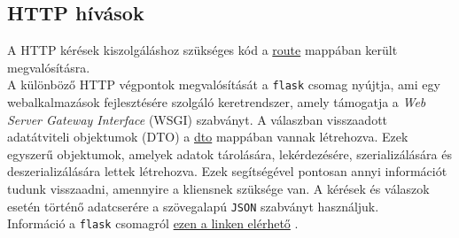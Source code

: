 \documentclass[11pt, a4paper]{article}
\begin{document}
			
		\subsection{HTTP hívások}
			\label{subs:httpcalls}
			\begin{flushleft}
				\justifying
				A HTTP kérések kiszolgáláshoz szükséges kód a 
				\color{blue}
				\href{https://github.com/mark182182/GKLB_INTM020_mikroelektromechanikai_rendszerek/tree/main/route}{route}
				\color{black} mappában került megvalósításra. \\
				A különböző HTTP végpontok megvalósítását a \texttt{flask} csomag nyújtja, ami egy webalkalmazások fejlesztésére szolgáló keretrendszer, amely támogatja a \emph{Web Server Gateway Interface} (WSGI) szabványt.
				A válaszban visszaadott adatátviteli objektumok (DTO) a
				\color{blue}
				\href{https://github.com/mark182182/GKLB_INTM020_mikroelektromechanikai_rendszerek/tree/main/dto}{dto}
				\color{black} mappában vannak létrehozva. Ezek egyszerű objektumok, amelyek adatok tárolására, lekérdezésére, szerializálására és deszerializálására lettek létrehozva. Ezek segítségével pontosan annyi információt tudunk visszaadni, amennyire a kliensnek szüksége van. A kérések és válaszok esetén történő adatcserére a szövegalapú \texttt{JSON} szabványt használjuk. \\
				Információ a \texttt{flask} csomagról
				\color{blue}
				\href{https://flask.palletsprojects.com/en/3.0.x/}{ezen a linken elérhető}
				\color{black}.
			\end{flushleft}
\end{document}
